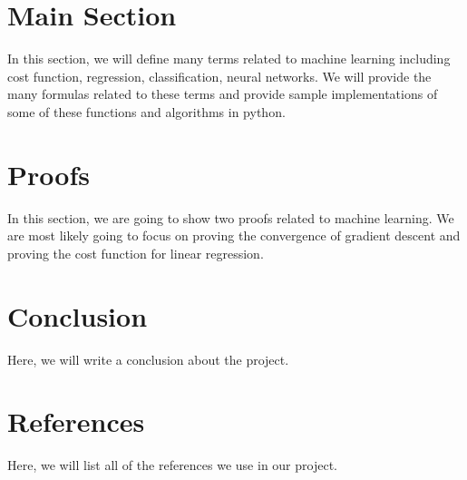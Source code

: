 \documentclass{article}
\begin{document}
\section{Main Section}
In this section, we will define many terms related to machine learning including  cost function, regression, classification, neural networks. We will provide the many formulas related to these terms and provide sample implementations of some of these functions and algorithms in python.
\section{Proofs}
In this section, we are going to show two proofs related to machine learning. We are most likely going to focus on proving the convergence of gradient descent and proving the cost function for linear regression.
\section{Conclusion}
Here, we will write a conclusion about the project.
\section{References}
Here, we will list all of the references we use in our project.
\end{document}
